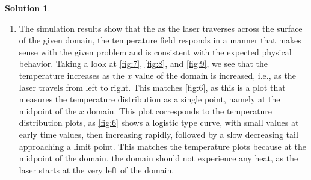 \documentclass[12pt]{article}
\theoremstyle{definition} %
\newtheorem{solution}{Solution}
\theoremstyle{plain} %
\begin{document}
\begin{solution}
\begin{enumerate}
        \item The simulation results show that the as the laser traverses across the surface of the given domain, the temperature field responds in a manner that makes sense with the given problem and is consistent with the expected physical behavior. Taking a look at \autoref{fig:7}, \autoref{fig:8}, and \autoref{fig:9}, we see that the temperature increases as the $x$ value of the domain is increased, i.e., as the laser travels from left to right. This matches \autoref{fig:6}, as this is a plot that measures the temperature distribution as a single point, namely at the midpoint of the $x$ domain. This plot corresponds to the temperature distribution plots, as \autoref{fig:6} shows a logistic type curve, with small values at early time values, then increasing rapidly, followed by a slow decreasing tail approaching a limit point. This matches the temperature plots because at the midpoint of the domain, the domain should not experience any heat, as the laser starts at the very left of the domain. 
        \end{enumerate}

\end{solution}
\end{document}
